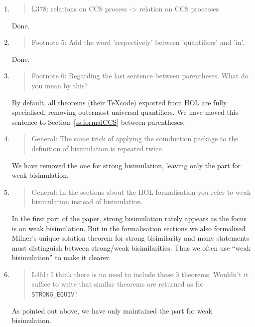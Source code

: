 \begin{enumerate}
\item \begin{quote}
    L378: relations on CCS process -> relation on CCS processes
  \end{quote}
  \Mark
  Done.
  
\item \begin{quote}
    Footnote 5: Add the word 'respectively' between 'quantifiers' and 'in'.
  \end{quote}
  \Mark
  Done.
  
\item \begin{quote}
    Footnote 6: Regarding the last sentence between parentheses. What do you mean by this?
  \end{quote}
  \Mark
  By default, all theorems (their \TeX code) exported from HOL are
  fully specialised, removing outermost universal quantifiers. We have
  moved this sentence to Section~\ref{ss:formalCCS} between parentheses.
  
\item \begin{quote}
    General: The same trick of applying the coinduction package to the
    definition of bisimulation is repeated twice.
  \end{quote}
  \Mark
  We have removed the one for strong bisimulation, leaving
  only the part for weak bisimulation.
  
\item \begin{quote}
    General: In the sections about the HOL formalisation you refer to
    weak bisimulation instead of bisimulation.    
  \end{quote}
  \Mark
  In the first part of the paper, strong bisimulation rarely appears
  as the focus is on weak bisimulation. But in the formalisation
  sections we also formalised Milner's unique-solution theorem for
  strong bisimilarity and many statements must distinguish between
  strong/weak bisimilarities. Thus we often use ``weak bisimulation''
  to make it  clearer. 
  
\item \begin{quote}
    L461: I think there is no need to include those 3
    theorems. Wouldn’t it suffice to write that similar theorems are
    returned as for \texttt{STRONG\_EQUIV}?
  \end{quote}
  \Mark
 As pointed out above, we have  only maintained 
 the part for weak bisimulation.
  

\end{enumerate}
